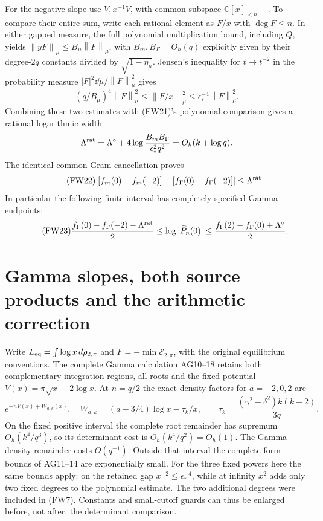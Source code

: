 \documentclass[11pt]{article}
\newcommand{\C}{\mathbb C}\newcommand{\R}{\mathbb R}
\newcommand{\norm}[1]{\left\lVert#1\right\rVert}
\begin{document}
For the negative slope use $V,x^{-1}V$, with common subspace
$\C[x]_{<n-1}$. To compare their entire sum, write each rational
element as $F/x$ with $\deg F\le n$. In either gapped measure,
the full polynomial multiplication bound, including $Q$, yields
$\norm{yF}_\mu\le B_\mu\norm F_\mu$, with
$B_m,B_\Gamma=O_h(q)$ explicitly given by their degree-$2q$ constants
divided by $\sqrt{1-\eta_\mu}$.
Jensen's inequality for $t\mapsto t^{-2}$ in the probability measure
$|F|^2\dd\mu/\norm F_\mu^2$ gives
\[
 (q/B_\mu)^4\norm F_\mu^2\le\norm{F/x}_\mu^2
 \le\epsilon_*^{-4}\norm F_\mu^2.
\]
Combining these two estimates with (FW21)'s polynomial comparison
gives a rational logarithmic width
\[
 \Lambda^{\rm rat}=\Lambda^\circ+
     4\log\frac{B_mB_\Gamma}{\epsilon_*^2q^2}=O_h(k+\log q).
\]
The identical common-Gram cancellation proves
\begin{equation}\tag{FW22}
 |[f_m(0)-f_m(-2)]-[f_\Gamma(0)-f_\Gamma(-2)]|
 \le\Lambda^{\rm rat}.
\end{equation}
In particular the following finite interval has completely specified
Gamma endpoints:
\begin{equation}\tag{FW23}
 \frac{f_\Gamma(0)-f_\Gamma(-2)-\Lambda^{\rm rat}}2
 \le\log|\widehat P_n(0)|\le
 \frac{f_\Gamma(2)-f_\Gamma(0)+\Lambda^\circ}2.
\end{equation}

\section{Gamma slopes, both source products and the arithmetic correction}
Write $L_{\rm eq}=\int\log x\,d\rho_{2,\pi}$ and
$F=-\min\mathcal E_{2,\pi}$, with the original equilibrium conventions.
The complete Gamma calculation AG10--18 \cite{ag} retains both
complementary integration regions, all roots and the fixed potential
$V(x)=\pi\sqrt x-2\log x$. At $n=q/2$ the exact density factors for
$a=-2,0,2$ are
\begin{equation}\tag{FW24}
 e^{-nV(x)+W_{a,k}(x)},\quad
 W_{a,k}=(a-3/4)\log x-\tau_k/x,\qquad
 \tau_k=\frac{(\gamma^2-\delta^2)k(k+2)}{3q}.
\end{equation}
On the fixed positive interval the complete root remainder has
supremum $O_h(k^4/q^3)$, so its determinant cost is $O_h(k^4/q^2)=O_h(1)$.
The Gamma-density remainder costs $O(q^{-1})$. Outside that interval
the complete-form bounds of AG11--14 are exponentially small.
For the three fixed powers here the same bounds apply: on the retained
gap $x^{-2}\le\epsilon_*^{-4}$, while at infinity $x^2$ adds only two
fixed degrees to the polynomial estimate. The two additional degrees
were included in (FW7). Constants and small-cutoff guards can thus be
enlarged before, not after, the determinant comparison.
\end{document}
